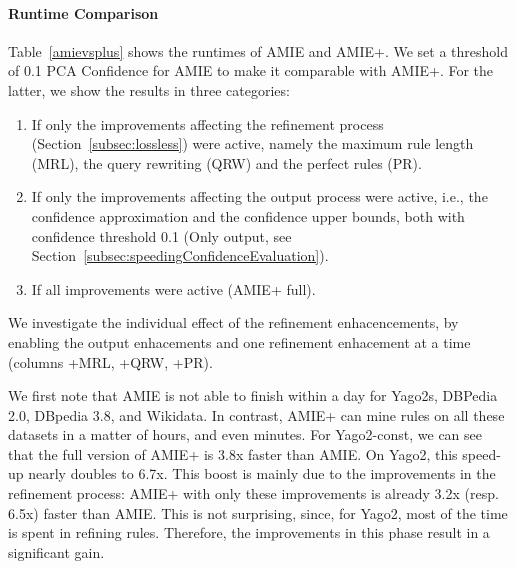 \paragraph{Runtime Comparison}
Table~\ref{amievsplus} shows the runtimes of AMIE and AMIE+. We set a threshold of 0.1 PCA Confidence for AMIE to make it
comparable with AMIE+. For the latter, we show the results in three categories:
\begin{enumerate}
 \item If only the improvements affecting the refinement process (Section~\ref{subsec:lossless}) were active, namely the 
 maximum rule length (MRL), the query rewriting (QRW) and the perfect rules (PR).
 \item If only the improvements affecting the output process were active, i.e., 
 the confidence approximation and the confidence upper bounds, both with confidence threshold 0.1 (Only output, see Section~\ref{subsec:speedingConfidenceEvaluation}).
 \item If all improvements were active (AMIE+ full). 
\end{enumerate}

We investigate the individual effect of the refinement enhacencements, by enabling the output enhacements and one refinement
enhacement at a time (columns +MRL, +QRW, +PR).

We first note that AMIE is not able to finish within a day for Yago2s, DBPedia 2.0, DBpedia 3.8, and Wikidata. In contrast, 
AMIE+ can mine rules on all these datasets in a matter of hours, and even minutes.
For Yago2-const, we can see that the full version of AMIE+ is 3.8x faster than AMIE. 
On Yago2, this speed-up nearly doubles to 6.7x. This boost is mainly due to the improvements
in the refinement process: AMIE+ with only these improvements is already 3.2x (resp. 6.5x) faster than AMIE. 
This is not surprising, since,
for Yago2, most of the time is spent in refining rules. Therefore, the improvements in this phase result in a significant gain.

